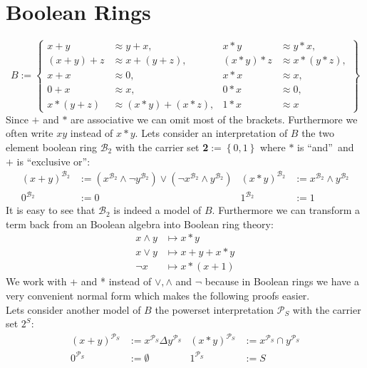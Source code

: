 \section{Boolean Rings}
\[B:=\left\lbrace 
	\begin{aligned}
		x+y     & \approx y+x,         & x*y     & \approx y*x,     \\
		(x+y)+z & \approx x+(y+z),     & (x*y)*z & \approx x*(y*z), \\
		x+x     & \approx 0,           & x*x     & \approx x,       \\
		0+x     & \approx x,           & 0*x     & \approx 0,       \\
		x*(y+z) & \approx (x*y)+(x*z), & 1*x     & \approx x        
	\end{aligned}
	\right\rbrace \]
	Since $+$ and $*$ are associative we can omit most of the brackets. Furthermore we often write $xy$ instead of $x*y$.
	Lets consider an interpretation of $B$ the two element boolean ring $\mathcal{B}_2$ with the carrier set \textbf{2}$:=\left\lbrace 0,1\right\rbrace$ where $*$ is \textquotedblleft and\textquotedblright\ and $+$ is \textquotedblleft exclusive or\textquotedblright:
	\begin{align*}
		(x+y)^{\mathcal{B}_2} & :=\left( x^{\mathcal{B}_2}\wedge\neg y^{\mathcal{B}_2}\right)  \vee \left( \neg x^{\mathcal{B}_2}\wedge y^{\mathcal{B}_2}\right) & (x*y)^{\mathcal{B}_2} & :=x^{\mathcal{B}_2}\wedge y^{\mathcal{B}_2} \\
		0^{\mathcal{B}_2}     & :=0                                 & 1^{\mathcal{B}_2} & :=1                                      
	\end{align*}
	It is easy to see that $\mathcal{B}_2$ is indeed a model of $B$. Furthermore we can transform a term back from an Boolean algebra into Boolean ring theory:
	\begin{align*}
		x \wedge y&\mapsto x*y\\
		x\vee y&\mapsto x+y+x*y\\
		\neg x&\mapsto x*(x+1)
	\end{align*}
	We work with + and * instead of $\vee,\wedge$ and $\neg$ because in Boolean rings we have a very convenient normal form which makes the following proofs easier.\\
	Lets consider another model of $B$ the powerset interpretation $\mathcal{P}_S$ with the carrier set $2^S$:
	\begin{align*}
		(x+y)^{\mathcal{P}_S} & :=x^{\mathcal{P}_S}\Delta y^{\mathcal{P}_S} & (x*y)^{\mathcal{P}_S} & :=x^{\mathcal{P}_S}\cap y^{\mathcal{P}_S} \\
		0^{\mathcal{P}_S}     & :=\emptyset                                 & 1^{\mathcal{P}_S} & :=S                                       
	\end{align*}
